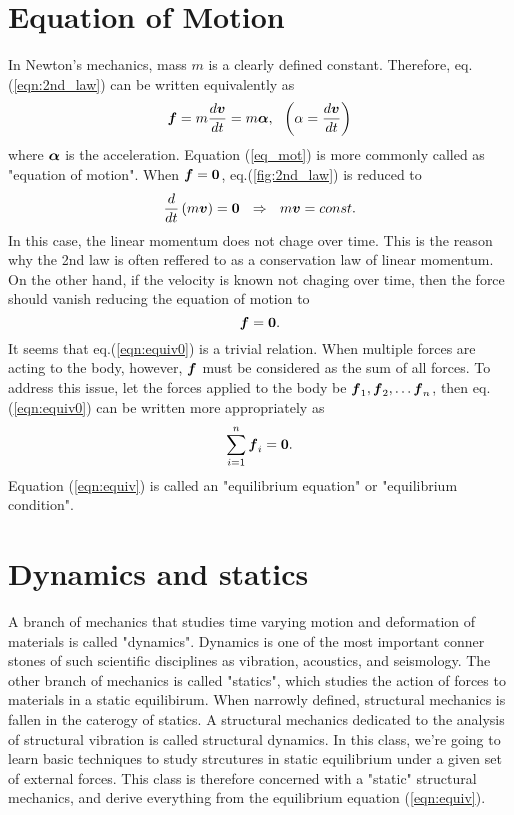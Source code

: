 \documentclass[10pt,a4j]{article}
\begin{document}
\section{Equation of Motion}
In Newton's mechanics, mass $m$ is a clearly defined constant. 
Therefore, eq.(\ref{eqn:2nd_law}) can be written equivalently as 
\begin{equation}
	\fat{f}=m \frac{d\fat{v}}{dt}=m\fat{\alpha}, \ \ \left(\alpha=\frac{d\fat{v}}{dt}\right)
	\label{eqn:eq_mot}
\end{equation}
where $\mbox{\boldmath $\alpha$}$ is the acceleration.
Equation (\ref{eq_mot}) is more commonly called as "equation of motion".
When $\mbox{\boldmath $f$}=\mbox{\boldmath $0$}$, eq.(\ref{fig:2nd_law}) is reduced to 
\begin{equation}
	\frac{d}{dt}\left(m\fat{v}\right)=\fat{0} \ \ \Rightarrow \ \ 
	m\fat{v}=const.
	\label{eqn:mv_cnst}
\end{equation}
In this case, the linear momentum does not chage over time. This is the reason why 
the 2nd law is often reffered to as a conservation law of linear momentum.
On the other hand, if the velocity is known not chaging over time, then the force 
should vanish reducing the equation of motion to  
\begin{equation}
	\mbox{\boldmath $f$}=\mbox{\boldmath $0$}.
	\label{eqn:equiv0}
\end{equation}
It seems that eq.(\ref{eqn:equiv0}) is a trivial relation. 
When multiple forces are acting to the body, however, $\mbox{\boldmath $f$}$ 
must be considered as the sum of all forces. To address this issue, 
let the forces applied to the body be $\mbox{\boldmath $f$}_1, \mbox{\boldmath $f$}_2,\dots \mbox{\boldmath $f$}_n$, then 
eq.(\ref{eqn:equiv0}) can be written more appropriately as 
\begin{equation}
	\sum_{i=1}^n\mbox{\boldmath $f$}_i=\mbox{\boldmath $0$}.
	\label{eqn:equiv}
\end{equation}
Equation (\ref{eqn:equiv}) is called an "equilibrium equation" or "equilibrium condition". 
\section{Dynamics and statics}
A branch of mechanics that studies time varying motion and deformation of materials is 
called "dynamics". Dynamics is one of the most important conner stones of such scientific 
 disciplines as vibration, acoustics, and seismology.
The other branch of mechanics is called "statics", which studies the action of forces 
to materials in a static equilibirum. When narrowly defined, structural mechanics is fallen 
in the caterogy of statics. A structural mechanics dedicated to the analysis of structural vibration 
is called structural dynamics. 
In this class, we're going to learn basic techniques to study strcutures in static equilibrium 
under a given set of external forces. 
This class is therefore concerned with a "static" structural mechanics, and derive everything 
from the equilibrium equation (\ref{eqn:equiv}). 
\end{document}
